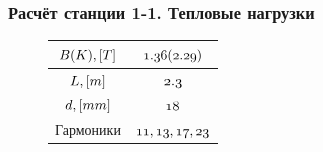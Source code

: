 \documentclass[14pt, hyperref = {colorlinks}]{beamer}
\begin{document}
\begin{frame}
\frametitle{Расчёт станции 1-1. Тепловые нагрузки}\label{t1}
\begin{figure}[h]
	\begin{minipage}[h]{0.49\linewidth}
		\tiny
		\vspace{-15pt}
		\begin{table}[h]
			\begin{tabular}{c|c}
				\hline\hline
				\rule{0pt}{3ex}$\mathnormal{B(K), [T]}$   & $\mathnormal{1.36(2.29)}$   \\ \hline
				\rule{0pt}{3ex}$\mathnormal{L, [m]}$ 	  & $\mathnormal{2.3}$          \\ \hline
				\rule{0pt}{3ex}$\mathnormal{d, [mm]}$     & $\mathnormal{18}$    		\\ \hline
				\rule{0pt}{3ex}Гармоники	              & $\mathnormal{11, 13, 17, 23}$  \\
				\hline\hline
			\end{tabular}
		\end{table}
	\vspace{-25pt}
	\tiny{}
	\end{minipage}
	\begin{minipage}[h]{0.49\linewidth}
		\vspace{-15pt}
		\vspace{-15pt}
		\tiny{}
	\end{minipage}
\end{figure}
\begin{figure}[h]
	\vspace{-30pt}
\end{figure}

\end{frame}
\end{document}
